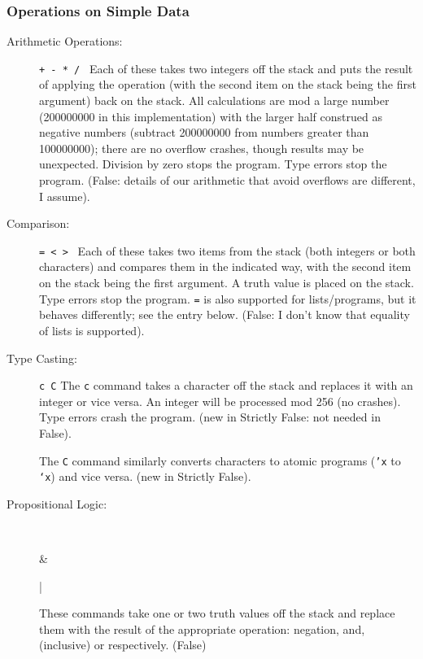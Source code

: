 \documentclass[12pt]{article}
\begin{document}
\subsubsection{Operations on Simple Data}
\begin{description}

\item[Arithmetic Operations:] {\tt + - * / } Each of these takes two
integers off the stack and puts the result of applying the operation
(with the second item on the stack being the first argument) back on
the stack.  All calculations are mod a large number (200000000 in this
implementation) with the larger half construed as negative numbers (subtract
200000000 from numbers greater than 100000000); there are no overflow
crashes, though results may be unexpected.  Division by zero stops
the program.  Type errors stop the program.  (False:  details of our
arithmetic that avoid overflows are different, I assume).

\item[Comparison:] {\tt = < > }  Each of these takes two items from
the stack (both integers or both characters) and compares them in the
indicated way, with the second item on the stack being the first
argument.  A truth value is placed on the stack.  Type errors stop
the program.  {\tt =} is also supported for lists/programs, but
it behaves differently; see the entry below.  (False:  I don't know that
equality of lists is supported).

\item[Type Casting:] {\tt c C} The {\tt c} command takes a character
off the stack and replaces it with an integer or vice versa.  An
integer will be processed mod 256 (no crashes).  Type errors crash the
program.  (new in Strictly False: not needed in False).

The {\tt C} command similarly converts characters to atomic programs
({\tt 'x} to {\tt `x}) and vice versa.  (new in Strictly False).

\item[Propositional Logic:] \begin{verb} ~ \end{verb} \begin{verb} & \end{verb} \begin{verb} | \end{verb}  These commands take one
or two truth values off the stack and replace them with the result of
the appropriate operation: negation, and, (inclusive) or respectively. (False)
\end{description}
\end{document}
